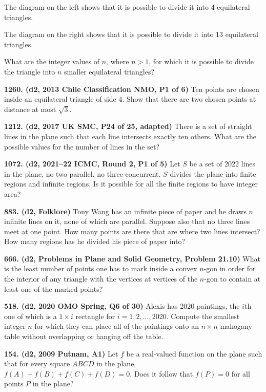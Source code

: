 \documentclass{article}
\begin{document}
The diagram on the left shows that it is possible to divide it into 4 equilateral triangles.

The diagram on the right shows that it is possible to divide it into 13 equilateral triangles.

What are the integer values of $n$, where $n>1$, for which it is possible to divide the triangle into $n$ smaller equilateral triangles?

\textbf{1260. (\color{red}d2\color{black}, 2013 Chile Classification NMO, P1 of 6)} Ten points are chosen inside an equilateral triangle of side 4. Show that there are two chosen points at distance at most $\sqrt{3}$.

\textbf{1212. (\color{red}d2\color{black}, 2017 UK SMC, P24 of 25, adapted)} There is a set of straight lines in the plane such that each line intersects exactly ten others. What are the possible values for the number of lines in the set?

\textbf{1072. (\color{red}d2\color{black}, 2021–22 ICMC, Round 2, P1 of 5)} Let $S$ be a set of 2022 lines in the plane, no two parallel, no three concurrent. $S$ divides the plane into finite regions and infinite regions. Is it possible for all the finite regions to have integer area?

\textbf{883. (\color{red}d2\color{black}, Folklore)} Tony Wang has an infinite piece of paper and he draws $n$ infinite lines on it, none of which are parallel. Suppose also that no three lines meet at one point. How many points are there that are where two lines intersect? How many regions has he divided his piece of paper into?

\textbf{666. (\color{red}d2\color{black}, Problems in Plane and Solid Geometry, Problem 21.10)} What is the least number of points one has to mark inside a convex $n$-gon in order for the interior of any triangle with the vertices at vertices of the $n$-gon to contain at least one of the marked points?

\textbf{518. (\color{red}d2\color{black}, 2020 OMO Spring, Q6 of 30)} Alexis has 2020 paintings, the $i$th one of which is a $1 \times i$ rectangle for $i=1,2, \ldots, 2020 .$ Compute the smallest integer $n$ for which they can place all of the paintings onto an $n \times n$ mahogany table without overlapping or hanging off the table.

\textbf{154. (\color{red}d2\color{black}, 2009 Putnam, A1)} Let $f$ be a real-valued function on the plane such that for every square $ABCD$ in the plane, $f(A) + f(B) + f(C) +f(D) = 0$. Does it follow that $f(P) = 0$ for all points $P$ in the plane?
\end{document}
